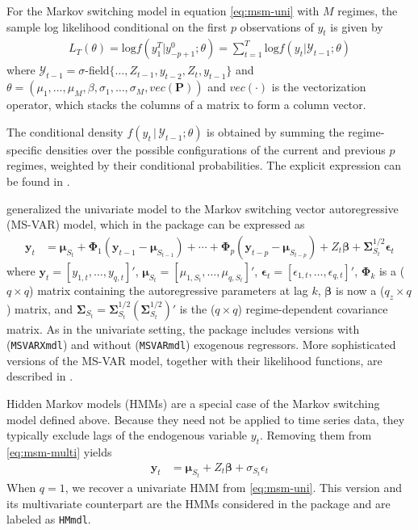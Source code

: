 For the Markov switching model in equation \eqref{eq:msm-uni} with \(M\) regimes, the sample log likelihood conditional on the first \(p\) observations of \(y_{t}\) is given by
\begin{align}
    L_{T} (\theta) = \mathrm{log} f(y_{1}^{T}|y^{0}_{-p+1};\theta) = \sum^{T}_{t=1} \mathrm{log} f(y_{t}|\mathcal{Y}_{t-1};\theta) \label{eq:arms-loglik}
\end{align}
where \(\mathcal{Y}_{t-1} = \sigma\)-field\(\{\dots,Z_{t-1},y_{t-2}, Z_{t}, y_{t-1}\}\) and \(\theta = (\mu_{1}, \dots, \mu_{M}, \beta, \sigma_{1}, \dots, \sigma_{M}, vec(\textbf{P}))\) and \(vec(\cdot)\) is the vectorization operator, which stacks the columns of a matrix to form a column vector.

The conditional density \(f(y_{t}\,|\,\mathcal{Y}_{t-1};\theta)\) is obtained by summing the regime-specific densities over the possible configurations of the current and previous \(p\) regimes, weighted by their conditional probabilities. The explicit expression can be found in \citep{hamilton89, hamilton1994, rodrondufour_mcmstest}.

\citet{krolzig1997markov} generalized the univariate model to the Markov switching vector autoregressive (MS-VAR) model, which in the  package can be expressed as
\begin{align}
    \pmb{y}_t & = \pmb{\mu}_{S_t} + \pmb{\Phi}_1(\pmb{y}_{t-1} - \pmb{\mu}_{S_{t-1}}) + \cdots + \pmb{\Phi}_p(\pmb{y}_{t-p} - \pmb{\mu}_{S_{t-p}}) + Z_{t}\pmb{\beta} + \pmb{\Sigma}^{1/2}_{S_t}\pmb{\epsilon}_t \label{eq:msm-multi}
\end{align}
where \(\pmb{y}_t = [y_{1,t}, \dots, y_{q,t}]'\), \(\pmb{\mu}_{S_t} = [\mu_{1,S_t}, \dots, \mu_{q,S_t}]'\), \(\pmb{\epsilon}_t = [\epsilon_{1,t}, \dots, \epsilon_{q,t}]'\), \(\pmb{\Phi}_k\) is a (\(q \times q\)) matrix containing the autoregressive parameters at lag \(k\), \(\pmb{\beta}\) is now a (\(q_z \times q\)) matrix, and \(\pmb{\Sigma}_{S_t}=\pmb{\Sigma}^{1/2}_{S_t}(\pmb{\Sigma}^{1/2}_{S_t})'\) is the (\(q \times q\)) regime-dependent covariance matrix. As in the univariate setting, the  package includes versions with (\texttt{MSVARXmdl}) and without (\texttt{MSVARmdl}) exogenous regressors. More sophisticated versions of the MS-VAR model, together with their likelihood functions, are described in \citet{krolzig1997markov}.

Hidden Markov models (HMMs) are a special case of the Markov switching model defined above. Because they need not be applied to time series data, they typically exclude lags of the endogenous variable \(y_t\). Removing them from \eqref{eq:msm-multi} yields
\begin{align}
    \pmb{y}_t & = \pmb{\mu}_{S_t} + Z_{t}\pmb{\beta} + \sigma_{S_t}\epsilon_t \label{eq:hmm}
\end{align}
When \(q=1\), we recover a univariate HMM from \eqref{eq:msm-uni}. This version and its multivariate counterpart are the HMMs considered in the package  and are labeled as \texttt{HMmdl}.

